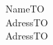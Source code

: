 \documentclass[gnebehay,paper=a4,version=last,fontsize=11pt,DIV=13,BCOR=0mm]{scrlttr2}
\begin{document}
\begin{letter}{NameTO\\AdressTO\\AdressTO}

  \subject{}

  \opening{}

  \closing{}

\end{letter}
\end{document}

